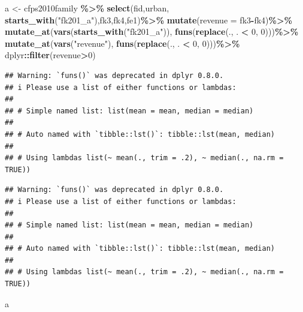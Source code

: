 \documentclass[
  oneside]{book}
\newenvironment{Shaded}{\begin{snugshade}}{\end{snugshade}}
\newcommand{\AttributeTok}[1]{\textcolor[rgb]{0.13,0.29,0.53}{#1}}
\newcommand{\DecValTok}[1]{\textcolor[rgb]{0.00,0.00,0.81}{#1}}
\newcommand{\FunctionTok}[1]{\textcolor[rgb]{0.13,0.29,0.53}{\textbf{#1}}}
\newcommand{\NormalTok}[1]{#1}
\newcommand{\OtherTok}[1]{\textcolor[rgb]{0.56,0.35,0.01}{#1}}
\newcommand{\SpecialCharTok}[1]{\textcolor[rgb]{0.81,0.36,0.00}{\textbf{#1}}}
\newcommand{\StringTok}[1]{\textcolor[rgb]{0.31,0.60,0.02}{#1}}
\begin{document}
\begin{Shaded}
\begin{Highlighting}[]
\NormalTok{a }\OtherTok{\textless{}{-}}\NormalTok{ cfps2010family }\SpecialCharTok{\%\textgreater{}\%}
  \FunctionTok{select}\NormalTok{(fid,urban, }\FunctionTok{starts\_with}\NormalTok{(}\StringTok{"fk201\_a"}\NormalTok{),fk3,fk4,fe1)}\SpecialCharTok{\%\textgreater{}\%}
  \FunctionTok{mutate}\NormalTok{(}\AttributeTok{revenue =}\NormalTok{ fk3}\SpecialCharTok{{-}}\NormalTok{fk4)}\SpecialCharTok{\%\textgreater{}\%}
  \FunctionTok{mutate\_at}\NormalTok{(}\FunctionTok{vars}\NormalTok{(}\FunctionTok{starts\_with}\NormalTok{(}\StringTok{"fk201\_a"}\NormalTok{)), }\FunctionTok{funs}\NormalTok{(}\FunctionTok{replace}\NormalTok{(., . }\SpecialCharTok{\textless{}} \DecValTok{0}\NormalTok{, }\DecValTok{0}\NormalTok{)))}\SpecialCharTok{\%\textgreater{}\%}
  \FunctionTok{mutate\_at}\NormalTok{(}\FunctionTok{vars}\NormalTok{(}\StringTok{"revenue"}\NormalTok{), }\FunctionTok{funs}\NormalTok{(}\FunctionTok{replace}\NormalTok{(., . }\SpecialCharTok{\textless{}} \DecValTok{0}\NormalTok{, }\DecValTok{0}\NormalTok{)))}\SpecialCharTok{\%\textgreater{}\%}
\NormalTok{  dplyr}\SpecialCharTok{::}\FunctionTok{filter}\NormalTok{(revenue}\SpecialCharTok{\textgreater{}}\DecValTok{0}\NormalTok{)}
\end{Highlighting}
\end{Shaded}

\begin{verbatim}
## Warning: `funs()` was deprecated in dplyr 0.8.0.
## i Please use a list of either functions or lambdas:
## 
## # Simple named list: list(mean = mean, median = median)
## 
## # Auto named with `tibble::lst()`: tibble::lst(mean, median)
## 
## # Using lambdas list(~ mean(., trim = .2), ~ median(., na.rm = TRUE))
\end{verbatim}

\begin{verbatim}
## Warning: `funs()` was deprecated in dplyr 0.8.0.
## i Please use a list of either functions or lambdas:
## 
## # Simple named list: list(mean = mean, median = median)
## 
## # Auto named with `tibble::lst()`: tibble::lst(mean, median)
## 
## # Using lambdas list(~ mean(., trim = .2), ~ median(., na.rm = TRUE))
\end{verbatim}

\begin{Shaded}
\begin{Highlighting}[]
\NormalTok{a}
\end{Highlighting}
\end{Shaded}
\end{document}
